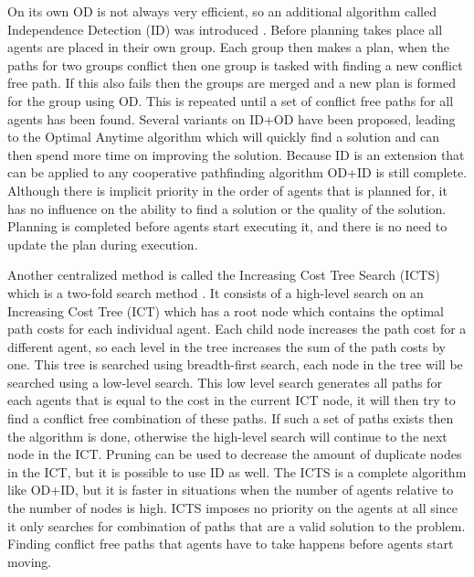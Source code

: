 \documentclass[a4paper]{article}
\begin{document}
On its own OD is not always very efficient, so an additional algorithm called
Independence Detection (ID) was introduced \cite{standley2010}. Before planning
takes place all agents are placed in their own group. Each group then makes a
plan, when the paths for two groups conflict then one group is tasked with
finding a new conflict free path. If this also fails then the groups are merged
and a new plan is formed for the group using OD. This is repeated until a
set of conflict free paths for all agents has been found. Several variants on
ID+OD have been proposed, leading to the Optimal Anytime algorithm
\cite{standley2011} which will quickly find a solution and can then spend more
time on improving the solution. Because ID is an extension that can be applied
to any cooperative pathfinding algorithm OD+ID is still complete. Although
there is implicit priority in the order of agents that is planned for, it has
no influence on the ability to find a solution or the quality of the solution.
Planning is completed before agents start executing it, and there is no need to
update the plan during execution.

Another centralized method is called the Increasing Cost Tree Search (ICTS)
which is a
two-fold search method \cite{sharon2013}. It consists of a high-level search on
an Increasing Cost Tree (ICT) which has a root node which contains the optimal
path costs for each individual agent. Each child node increases the path cost
for a different agent, so each level in the tree increases the sum of the path
costs by one. This tree is searched using breadth-first search, each node in
the tree will be searched using a low-level search. This low level search
generates all paths for each agents that is equal to the cost in the current
ICT node, it will then try to find a conflict free combination of these paths.
If such a set of paths exists then the algorithm is done, otherwise the
high-level search will continue to the next node in the ICT. Pruning can be
used to decrease the amount of duplicate nodes in the ICT, but it is possible
to use ID as well. The ICTS is a complete algorithm like OD+ID, but it is
faster in situations when the number of agents relative to the number of nodes
is high. ICTS imposes no priority on the agents at all since it only searches
for combination of paths that are a valid solution to the problem. Finding
conflict free paths that agents have to take happens before agents start moving.
\end{document}

